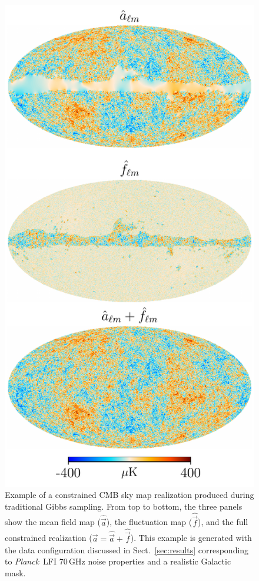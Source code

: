 \documentclass[twocolumn]{../common/aa}
\def\Planck{\emph{Planck}}
\renewcommand{\a}[0]{\vec{a}}
\newcommand{\f}[0]{\vec{f}}
\begin{document}
\begin{figure}
	\centering
	\includegraphics[width=\linewidth]{figures/s_hat_f_hat.pdf}
	\caption{\label{fig:sky_map}Example of a constrained CMB sky map realization produced during traditional Gibbs sampling. From top to bottom, the three panels show the mean field map ($\hat{\a}$), the fluctuation map ($\hat{\f}$), and the full constrained realization ($\a = \hat{\a}+\hat{\f}$). This example is generated with the data configuration discussed in Sect.~\ref{sec:results} corresponding to \Planck\ LFI 70\,GHz noise properties and a realistic Galactic mask.}
\end{figure}
\end{document}
